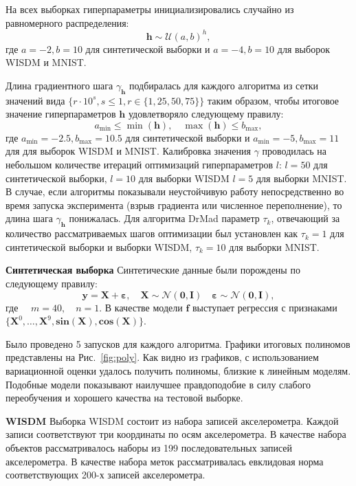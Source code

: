 На всех выборках гиперпараметры инициализировались случайно из равномерного распределения:
\[
    \mathbf{h} \sim \mathcal{U}(a,b)^h,
\]
где $a = -2, b = 10$ для синтетической выборки и $a = -4, b = 10$ для выборок WISDM и MNIST.

Длина градиентного шага $\gamma_{\mathbf{h}}$ подбиралась для каждого алгоритма из сетки значений вида $\{r \cdot 10^{s}, s \leq 1, r \in \{1,25,50,75\}\}$  таким образом, чтобы итоговое значение гиперпараметров  $\mathbf{h}$  удовлетворяло следующему правилу:
\[
    a_\text{min} \leq  \min(\mathbf{h}), \quad \max(\mathbf{h}) \leq b_\text{max},
\] 
где  $a_\text{min} = -2.5, b_\text{max}=10.5$ для синтетической выборки и $a_\text{min} = -5, b_\text{max}=11$ для для выборок WISDM и MNIST.
Калибровка значения $\gamma$ проводилась на небольшом количестве итераций оптимизаций гиперпараметров $l$:
$l = 50$ для синтетической выборки,  $l=10$ для выборки WISDM $l=5$ для выборки MNIST. В случае, если алгоритмы показывали неустойчивую работу непосредственно во время запуска эксперимента (взрыв градиента или численное переполнение), то длина шага $\gamma_\mathbf{h}$ понижалась. Для алгоритма DrMad параметр $\tau_k$, отвечающий за количество рассматриваемых шагов оптимизации был установлен как $\tau_k=1$ для синтетической выборки и выборки WISDM, $\tau_k=10$ для выборки MNIST.



\textbf{Синтетическая выборка }
Синтетические данные были порождены по следующему правилу:
\[
	\mathbf{y} = \mathbf{X} + \boldsymbol{\varepsilon},\quad \mathbf{X}  \sim \mathcal{N}(\mathbf{0}, \mathbf{I}) \quad \boldsymbol{\varepsilon} \sim \mathcal{N}(\mathbf{0}, \mathbf{I}),
\]
где $\quad m = 40, \quad n = 1.$
В качестве модели $\mathbf{f}$ выступает регрессия с признаками $\{\mathbf{X}^0, \dots, \mathbf{X}^9, \textbf{sin}(\mathbf{X}), \textbf{cos}(\mathbf{X})\}$.

Было проведено 5 запусков для каждого алгоритма.
Графики итоговых полиномов представлены на Рис.~\ref{fig:poly}. Как видно из графиков, с использованием вариационной оценки удалось получить полиномы, близкие к линейным моделям. Подобные модели показывают наилучшее правдоподобие в силу слабого переобучения и хорошего качества на тестовой выборке. 


\textbf{WISDM }
Выборка WISDM состоит из набора записей акселерометра. Каждой записи соответствуют три координаты по осям акселерометра. В качестве набора объектов рассматривалось наборы из 199 последовательных записей акселерометра. В качестве набора меток рассматривалась евклидовая норма соответствующих 200-х записей акселерометра.

